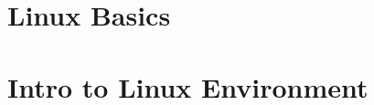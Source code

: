 \documentclass[11pt]{report}
\begin{document}
\tableofcontents

\chapter{Linux Basics}


\chapter{Intro to Linux Environment}

\end{document}
